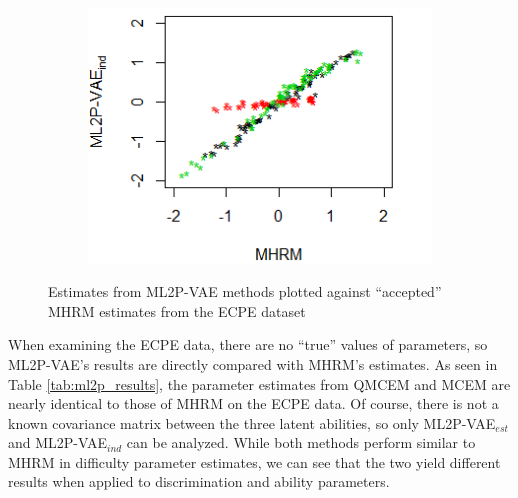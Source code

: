 \begin{figure}[h]
\begin{subfigure}{.32\textwidth}
    \end{subfigure}
    \begin{subfigure}{.32\textwidth}
      \centering
      \includegraphics[width=.9\linewidth]{img/ml_journal_results/ecpe/vae_ind_theta_ecpe.png}
    \end{subfigure}
    \caption{Estimates from ML2P-VAE methods plotted against ``accepted'' MHRM estimates from the ECPE dataset}
    \label{fig:ecpe_cor}
\end{figure}

When examining the ECPE data, there are no ``true'' values of parameters, so ML2P-VAE's results are directly compared with MHRM's estimates. As seen in Table \ref{tab:ml2p_results}, the parameter estimates from QMCEM and MCEM are nearly identical to those of MHRM on the ECPE data. Of course, there is not a known covariance matrix between the three latent abilities, so only ML2P-VAE$_{est}$ and ML2P-VAE$_{ind}$ can be analyzed. While both methods perform similar to MHRM in difficulty parameter estimates, we can see that the two yield different results when applied to discrimination and ability parameters. 

